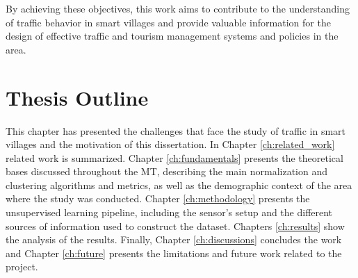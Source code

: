 By achieving these objectives, this work aims to contribute to the understanding of traffic behavior in smart villages and provide valuable information for the design of effective traffic and tourism management systems and policies in the area.

\section{Thesis Outline}


This chapter has presented the challenges that face the study of traffic in smart villages and the motivation of this dissertation. In Chapter \ref{ch:related_work} related work is summarized. Chapter \ref{ch:fundamentals} presents the theoretical bases discussed throughout the MT, describing the main normalization and clustering algorithms and metrics, as well as the demographic context of the area where the study was conducted. Chapter \ref{ch:methodology} presents the unsupervised learning pipeline, including the sensor's setup and the different sources of information used to construct the dataset. Chapters \ref{ch:results} show the analysis of the results. Finally, Chapter \ref{ch:discussions} concludes the work and Chapter \ref{ch:future} presents the limitations and future work related to the project.